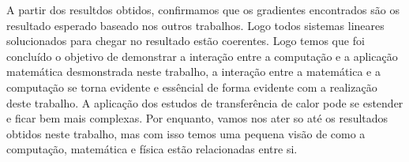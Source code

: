\documentclass[12pt,a4paper]{article}
\begin{document}
A partir dos resultdos obtidos, confirmamos que os gradientes encontrados são os resultado esperado baseado nos outros trabalhos. Logo todos sistemas lineares solucionados para chegar no resultado estão coerentes. Logo temos que foi concluído o objetivo de demonstrar a interação entre a computação e a aplicação matemática desmonstrada neste trabalho, a interação entre a matemática e a computação se torna evidente e essêncial de forma evidente com a realização deste trabalho. A aplicação dos estudos de transferência de calor pode se estender e ficar bem mais complexas. Por enquanto, vamos nos ater so até os resultados obtidos neste trabalho, mas com isso temos uma pequena visão de como a computação, matemática e física estão relacionadas entre si.









\end{document}

